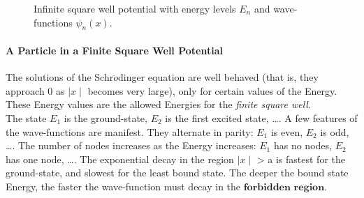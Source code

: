 \documentclass[a4paper, 10pt, onepage]{elegantbook}
\begin{document}
{\begin{figure}[h!]
\caption{Infinite square well potential with energy levels $E_n$ and wave-functions $\psi_n(x)$.}
\end{figure}

\paragraph{A Particle in a Finite Square Well Potential}

The solutions of the Schr$\ddot{o}$dinger equation are well behaved (that is, they approach 0 as $\mid x \mid$ becomes very large), only for certain values of the Energy. These Energy values are the allowed Energies for the \emph{finite square well}.  \\

The state $E_1$ is the ground-state, $E_2$ is the first excited state, \ldots. A few features of the wave-functions are manifest. They alternate in parity: $E_1$ is even, $E_2$ is odd, \ldots. The number of nodes increases as the Energy increases: $E_1$ has no nodes, $E_2$ has one node, \ldots. The exponential decay in the region $\mid x \mid$ > a is fastest for the ground-state, and slowest for the least bound state. The deeper the bound state Energy, the faster the wave-function must decay in the $\mathbf{\textbf{forbidden region}}$.  \\




}
\end{document}
